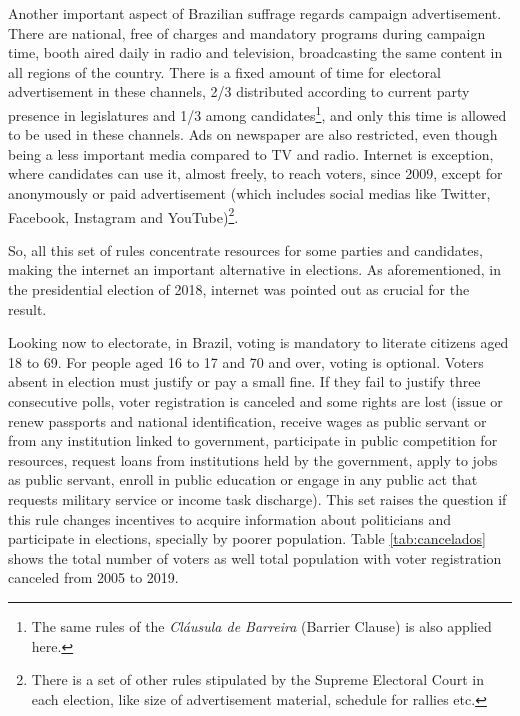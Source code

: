 \documentclass[
  12pt,
]{article}
\begin{document}
Another important aspect of Brazilian suffrage regards campaign
advertisement. There are national, free of charges and mandatory
programs during campaign time, booth aired daily in radio and
television, broadcasting the same content in all regions of the country.
There is a fixed amount of time for electoral advertisement in these
channels, 2/3 distributed according to current party presence in
legislatures and 1/3 among candidates\footnote{The same rules of the
  \emph{Cláusula de Barreira} (Barrier Clause) is also applied here.},
and only this time is allowed to be used in these channels. Ads on
newspaper are also restricted, even though being a less important media
compared to TV and radio. Internet is exception, where candidates can
use it, almost freely, to reach voters, since 2009, except for
anonymously or paid advertisement (which includes social medias like
Twitter, Facebook, Instagram and YouTube)\footnote{There is a set of
  other rules stipulated by the Supreme Electoral Court in each
  election, like size of advertisement material, schedule for rallies
  etc.}.

So, all this set of rules concentrate resources for some parties and
candidates, making the internet an important alternative in elections.
As aforementioned, in the presidential election of 2018, internet was
pointed out as crucial for the result.

Looking now to electorate, in Brazil, voting is mandatory to literate
citizens aged 18 to 69. For people aged 16 to 17 and 70 and over, voting
is optional. Voters absent in election must justify or pay a small fine.
If they fail to justify three consecutive polls, voter registration is
canceled and some rights are lost (issue or renew passports and national
identification, receive wages as public servant or from any institution
linked to government, participate in public competition for resources,
request loans from institutions held by the government, apply to jobs as
public servant, enroll in public education or engage in any public act
that requests military service or income task discharge). This set
raises the question if this rule changes incentives to acquire
information about politicians and participate in elections, specially by
poorer population. Table \ref{tab:cancelados} shows the total number of
voters as well total population with voter registration canceled from
2005 to 2019.
\end{document}
